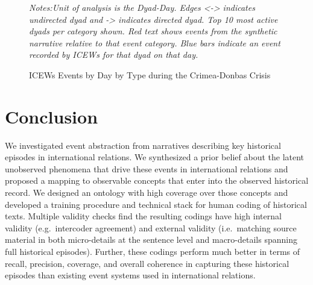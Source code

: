 \documentclass{article}
\begin{document}
\clearpage
\onecolumn
\begin{figure}[H]
\caption{ ICEWs Events by Day by Type during the Crimea-Donbas Crisis \label{fig:p_precision_icews}}
\textit{Notes:Unit of analysis is the Dyad-Day. Edges <-> indicates undirected dyad and -> indicates directed dyad. Top 10 most active dyads per category shown. Red text shows events from the synthetic narrative relative to that event category. Blue bars indicate an event recorded by ICEWs for that dyad on that day. }
\end{figure}
\clearpage
\twocolumn

\hypertarget{format}{%
\section*{Conclusion}\label{format}}

We investigated event abstraction from narratives describing key
historical episodes in international relations. We synthesized a prior
belief about the latent unobserved phenomena that drive these events in
international relations and proposed a mapping to observable concepts
that enter into the observed historical record. We designed an ontology
with high coverage over those concepts and developed a training
procedure and technical stack for human coding of historical texts.
Multiple validity checks find the resulting codings have high internal
validity (e.g.~intercoder agreement) and external validity
(i.e.~matching source material in both micro-details at the sentence
level and macro-details spanning full historical episodes). Further,
these codings perform much better in terms of recall, precision,
coverage, and overall coherence in capturing these historical episodes
than existing event systems used in international relations.
\end{document}
